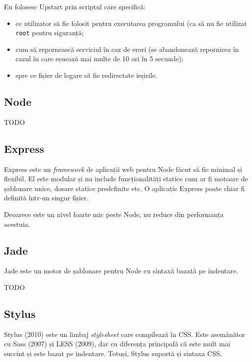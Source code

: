 \documentclass[a4wide,12pt]{report}
\newcommand{\eng}[1]{\emph{#1}} %
\newcommand{\cod}[1]{\texttt{#1}}
\newcommand{\idee}[1]{{\color{red} #1}}
\begin{document}
Eu folosesc Upstart prin scriptul care specifică:

\begin{itemize}

\item ce utilizator să fie folosit pentru executarea programului (ca să nu fie
utilizat \cod{root} pentru siguranță;

\item cum să repornească serviciul în caz de erori (se abandonează repornirea în
cazul în care eșuează mai multe de 10 ori în 5 secunde);

\item spre ce fișier de logare să fie redirectate ieșirile.

\end{itemize}

\subsection{Node}

\idee{TODO}

\subsection{Express}

Express este un \eng{framework} de aplicații web pentru Node făcut să fie
minimal și flexibil. El este modular și nu include funcționalități statice cum
ar fi motoare de șablonare unice, dosare statice predefinite etc. O aplicație
Express poate chiar fi definită într-un singur fișier.

Deoarece este un nivel foarte mic peste Node, nu reduce din performanța
acestuia.

\subsection{Jade}

Jade este un motor de șablonare pentru Node cu sintaxă bazată pe indentare.

\idee{TODO}

\subsection{Stylus}

Stylus (2010) este un limbaj \eng{stylesheet} care compilează în CSS. Este
asemănător cu Sass (2007) și LESS (2009), dar cu diferența principală că este
mult mai succint și este bazat pe indentare. Totuși, Stylus suportă și sintaxa
CSS.
\end{document}

